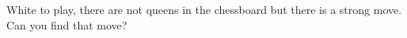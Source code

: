 \documentclass{article}
\begin{document}
White to play, there are not queens in the chessboard but there is a strong move. Can you find that move?

\newgame




\begin{center}
\showboard
\end{center}
\end{document}
